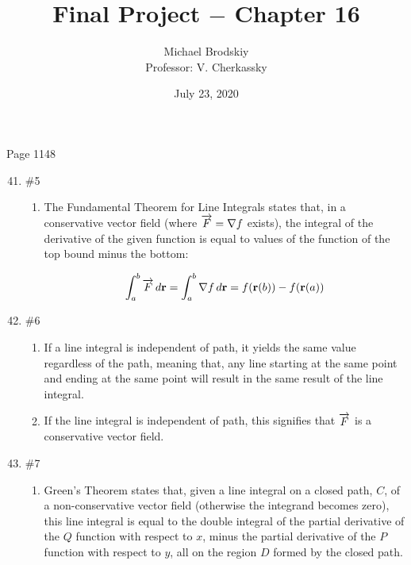 \documentclass[12pt]{article}
\title{Final Project $-$ Chapter 16}
\date{July 23, 2020}
\author{Michael Brodskiy\\ \small Professor: V. Cherkassky}
\begin{document}
\maketitle

\begin{center}

Page 1148

\end{center}

\begin{enumerate}

\setcounter{enumi}{40}

  \item \#5 \begin{enumerate}

      \item The Fundamental Theorem for Line Integrals states that, in a conservative vector field (where $\bold{\overrightarrow{F}}=\nabla f$ exists), the integral of the derivative of the given function is equal to values of the function of the top bound minus the bottom:

        $$\int_a^b \bold{\overrightarrow{F}}\,d\bold{r}=\int_a^b \nabla f\,d\bold{r}=f(\bold{r}(b))-f(\bold{r}(a))$$

    \end{enumerate}

  \item \#6 \begin{enumerate}

      \item If a line integral is independent of path, it yields the same value regardless of the path, meaning that, any line starting at the same point and ending at the same point will result in the same result of the line integral. 

      \item If the line integral is independent of path, this signifies that $\bold{\overrightarrow{F}}$ is a conservative vector field. 

    \end{enumerate}


    \item \#7

    \begin{enumerate}

      \item Green's Theorem states that, given a line integral on a closed path, $C$, of a non-conservative vector field (otherwise the integrand becomes zero), this line integral is equal to the double integral of the partial derivative of the $Q$ function with respect to $x$, minus the partial derivative of the $P$ function with respect to $y$, all on the region $D$ formed by the closed path. 
      

\end{enumerate}
\end{enumerate}
\end{document}
